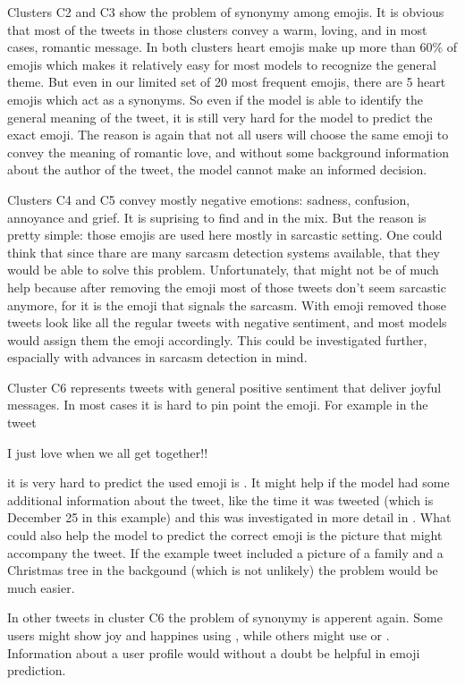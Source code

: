 \documentclass[10pt, a4paper]{article}
\begin{document}
Clusters C2 and C3 show the problem of synonymy among emojis. It is obvious that
most of the tweets in those clusters convey a warm, loving, and in most cases, 
romantic message. In both clusters heart emojis make up more than 60\% of emojis
which makes it relatively easy for most models to recognize the general theme. 
But even in our limited set of 20 most frequent emojis, there are 5 heart emojis
which act as a synonyms. So even if the model is able to identify the general 
meaning of the tweet, it is still very hard for the model to predict the exact 
emoji. The reason is again that not all users will choose the same emoji to 
convey the meaning of romantic love, and without some background information 
about the author of the tweet, the model cannot make an informed decision.

Clusters C4 and C5 convey mostly negative emotions: sadness, confusion, 
annoyance and grief. It is suprising to find  and  in 
the mix. But the reason is pretty simple: those emojis are used here mostly in 
sarcastic setting. One could think that since thare are many sarcasm detection 
systems available, that they would be able to solve this problem. Unfortunately,
that might not be of much help because after removing the emoji most of those 
tweets don't seem sarcastic anymore, for it is the emoji that signals the 
sarcasm. With emoji removed those tweets look like all the regular tweets with 
negative sentiment, and most models would assign them the emoji accordingly. 
This could be investigated further, espacially with advances in sarcasm 
detection in mind.

Cluster C6 represents tweets with general positive sentiment that deliver joyful
messages. In most cases it is hard to pin point the emoji. For example in the 
tweet
\begin{displayquote}
I just love when we all get together!! 
\end{displayquote}
it is very hard to predict the used emoji is . It might help if the 
model had some additional information about the tweet, like the time it was 
tweeted (which is December 25 in this example) and this was investigated in more
detail in \citep{barbieri2018exploring}. What could also help the model to 
predict the correct emoji is the picture that might accompany the tweet. If the 
example tweet included a picture of a family and a Christmas tree in the 
backgound (which is not unlikely) the problem would be much easier.

In other tweets in cluster C6 the problem of synonymy is apperent again. Some 
users might show joy and happines using , while others might use
 or . Information about a user profile would without a
doubt be helpful in emoji prediction.
\end{document}
